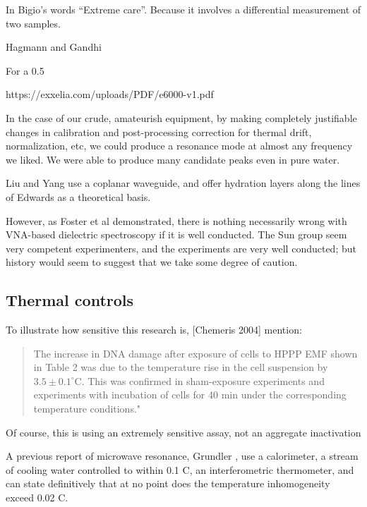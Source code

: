 \documentclass[paper.tex]{subfiles}
\begin{document}
\begin{multicols}{1}
In Bigio’s words “Extreme care”. Because it involves a differential measurement of two samples.

Hagmann and Gandhi \cite{Substitution1982}



For a 0.5%

https://exxelia.com/uploads/PDF/e6000-v1.pdf


In the case of our crude, amateurish equipment, by making completely justifiable changes in calibration and post-processing correction for thermal drift, normalization, etc, we could produce a resonance mode at almost any frequency we liked. We were able to produce many candidate peaks even in pure water.


Liu and Yang use a coplanar waveguide, and offer hydration layers along the lines of Edwards as a theoretical basis.




However, as Foster et al demonstrated, there is nothing necessarily wrong with VNA-based dielectric spectroscopy if it is well conducted. The Sun group seem very competent experimenters, and the experiments are very well conducted; but history would seem to suggest that we take some degree of caution.




\subsection{Thermal controls}

To illustrate how sensitive this research is, [Chemeris 2004] mention:

\begin{quote}
	
	The increase in DNA damage after exposure of cells to HPPP EMF shown in Table 2 was due to the temperature rise in the cell suspension by $3.5\pm0.1^{\circ}  $C. This was confirmed in sham-exposure experiments and experiments with incubation of cells for 40 min under the corresponding temperature conditions."
	
\end{quote}

Of course, this is using an extremely sensitive assay, not an aggregate inactivation 

A previous report of microwave resonance, Grundler \cite{Sharp1983}, use a calorimeter, a stream of cooling water controlled to within 0.1 C, an interferometric thermometer, and can state definitively that at no point does the temperature inhomogeneity exceed 0.02 C.


\end{multicols}
\end{document}
